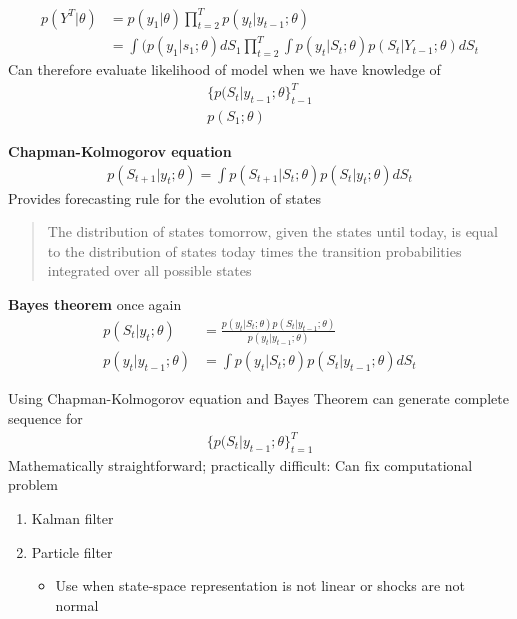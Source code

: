 \documentclass{beamer}
\begin{document}
\begin{frame}
  \begin{align}
   p(Y^T|\theta) &= p(y_1|\theta) \prod^T_{t=2}p(y_t|y_{t-1};\theta)\\
   &= \int(p(y_1|s_1;\theta)dS_1\prod^T_{t=2} \int p(y_t|S_t;\theta) p(S_t|Y_{t-1};\theta)dS_t
  \end{align}
  Can therefore evaluate likelihood of model when we have knowledge of
  \begin{align}
    \{p(S_t|y_{t-1};\theta \} ^T_{t-1}\\
    p(S_1;\theta)
  \end{align} 
\end{frame}

\begin{frame}
  \textbf{Chapman-Kolmogorov equation}
  \begin{align}
    p(S_{t+1}|y_t;\theta)=\int p(S_{t+1}|S_t;\theta)p(S_t|y_t;\theta)dS_t
  \end{align}
  Provides forecasting rule for the evolution of states
  \begin{quote}
    The distribution of states tomorrow, given the states until today, is equal to the distribution of states today times the transition probabilities integrated over all possible states
  \end{quote}
\end{frame}

\begin{frame}
  \textbf{Bayes theorem} once again
  \begin{align}
    p(S_t|y_t;\theta)&=\frac{p(y_t|S_t;\theta)p(S_t|y_{t-1};\theta)}{p(y_t|y_{t-1};\theta)}\\
    p(y_t|y_{t-1};\theta) &= \int p(y_t|S_t;\theta)p(S_t|y_{t-1};\theta)dS_t
  \end{align}
\end{frame}

\begin{frame}
  Using Chapman-Kolmogorov equation and Bayes Theorem can generate complete sequence for
  \begin{align}
    \{p(S_t|y_{t-1};\theta\}^T_{t=1}
  \end{align}
  \medskip
  Mathematically straightforward; practically difficult: Can fix computational problem
  \begin{enumerate}
    \item Kalman filter
    \item Particle filter
    \begin{itemize}
      \item Use when state-space representation is not linear or shocks are not normal
    \end{itemize}
  \end{enumerate}
\end{frame}
\end{document}
